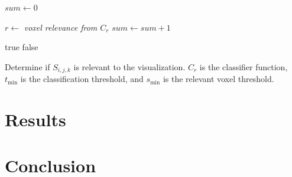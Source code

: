 \documentclass[journal]{vgtc}                %
\begin{document}
\begin{algorithm}[]
	\begin{algorithmic}[1]
		\State $sum \gets 0$  
		
		
		\State $r \gets$ \textit{voxel relevance from $C_{r}$} 
		\State $sum \gets sum + 1$  
		\EndIf
		\EndFor
		
		\State \Return true 
		\Else
		\State \Return false 
		\EndIf
		\EndProcedure
	\end{algorithmic}
	\caption{Determine if $S_{i,j,k}$ is relevant to the visualization. $C_r$ is the classifier function,
		$t_{\min}$ is the classification threshold, and $s_{\min}$ is the relevant voxel threshold.}
	\label{alg:threasholdSubVolume}
\end{algorithm}

\section{Results}


\section{Conclusion}




\end{document}
